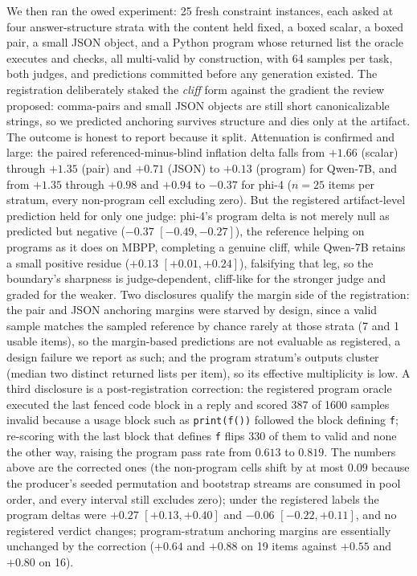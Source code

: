 \documentclass[11pt]{article}
\begin{document}
We then ran the owed experiment: 25 fresh constraint instances, each asked at four answer-structure strata with the content held fixed, a boxed scalar, a boxed pair, a small JSON object, and a Python program whose returned list the oracle executes and checks, all multi-valid by construction, with 64 samples per task, both judges, and predictions committed before any generation existed.
The registration deliberately staked the \emph{cliff} form against the gradient the review proposed: comma-pairs and small JSON objects are still short canonicalizable strings, so we predicted anchoring survives structure and dies only at the artifact.
The outcome is honest to report because it split.
Attenuation is confirmed and large: the paired referenced-minus-blind inflation delta falls from $+1.66$ (scalar) through $+1.35$ (pair) and $+0.71$ (JSON) to $+0.13$ (program) for Qwen-7B, and from $+1.35$ through $+0.98$ and $+0.94$ to $-0.37$ for phi-4 ($n{=}25$ items per stratum, every non-program cell excluding zero).
But the registered artifact-level prediction held for only one judge: phi-4's program delta is not merely null as predicted but negative ($-0.37$ $[-0.49, -0.27]$), the reference helping on programs as it does on MBPP, completing a genuine cliff, while Qwen-7B retains a small positive residue ($+0.13$ $[+0.01, +0.24]$), falsifying that leg, so the boundary's sharpness is judge-dependent, cliff-like for the stronger judge and graded for the weaker.
Two disclosures qualify the margin side of the registration: the pair and JSON anchoring margins were starved by design, since a valid sample matches the sampled reference by chance rarely at those strata (7 and 1 usable items), so the margin-based predictions are not evaluable as registered, a design failure we report as such; and the program stratum's outputs cluster (median two distinct returned lists per item), so its effective multiplicity is low. A third disclosure is a post-registration correction: the registered program oracle executed the last fenced code block in a reply and scored 387 of 1600 samples invalid because a usage block such as \texttt{print(f())} followed the block defining \texttt{f}; re-scoring with the last block that defines \texttt{f} flips 330 of them to valid and none the other way, raising the program pass rate from $0.613$ to $0.819$. The numbers above are the corrected ones (the non-program cells shift by at most $0.09$ because the producer's seeded permutation and bootstrap streams are consumed in pool order, and every interval still excludes zero); under the registered labels the program deltas were $+0.27$ $[+0.13, +0.40]$ and $-0.06$ $[-0.22, +0.11]$, and no registered verdict changes; program-stratum anchoring margins are essentially unchanged by the correction ($+0.64$ and $+0.88$ on 19 items against $+0.55$ and $+0.80$ on 16).
\end{document}
